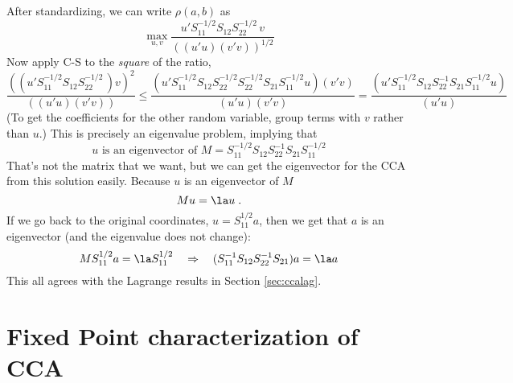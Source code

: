 \documentclass[12pt]{article}
\begin{document}
 After standardizing, we can write $\rho(a,b)$ as
 \begin{displaymath}
    \max_{u,v} \frac{u'S_{11}^{-1/2} S_{12} S_{22}^{-1/2}\,v}
                    {\left((u'u)(v'v)\right)^{1/2}}      
 \end{displaymath}
Now apply C-S to the {\em square} of the ratio,
 \begin{displaymath}
   \frac{((u'S_{11}^{-1/2} S_{12} S_{22}^{-1/2}\,)v)^2}
                    {\left((u'u)(v'v)\right)}
   \le 
   \frac{
    (u'S_{11}^{-1/2}S_{12}S_{22}^{-1/2}S_{22}^{-1/2}S_{21}S_{11}^{-1/2}u)
    (v'v)}
     {(u'u) (v'v) }
   = 
   \frac{
    (u'S_{11}^{-1/2}S_{12}S_{22}^{-1}S_{21}S_{11}^{-1/2}u)}
     {(u'u)}
 \end{displaymath}
 (To get the coefficients for the other random variable, group terms with $v$ rather than $u$.) This is precisely an eigenvalue problem, implying that 
 \begin{displaymath}
    u\mbox{ is an eigenvector of }
        M = S_{11}^{-1/2}S_{12}S_{22}^{-1}S_{21}S_{11}^{-1/2}
 \end{displaymath}
 That's not the matrix that we want, but we can get the eigenvector for the CCA
 from this solution easily. Because $u$ is an eigenvector of $M$
 \begin{displaymath}
     M u = \la u \;.
 \end{displaymath}
 If we go back to the original coordinates, $u = S_{11}^{1/2}a$, then we get
 that $a$ is an eigenvector (and the eigenvalue does not change):
 \begin{displaymath}
    M S_{11}^{1/2} a = \la S_{11}^{1/2}  \quad \Rightarrow \quad
    (S_{11}^{-1}S_{12}S_{22}^{-1}S_{21}) a = \la a
 \end{displaymath}
 This all agrees with the Lagrange results in Section \ref{sec:ccalag}.


\section{Fixed Point characterization of CCA}
\label{sec:fixedpoint}
\end{document}
